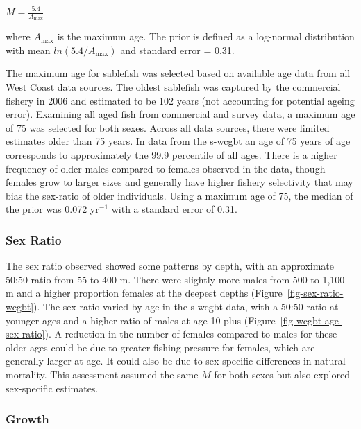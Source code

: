 \documentclass[
  english,
]{article}
\begin{document}
\begin{centering}

$M=\frac{5.4}{A_{\text{max}}}$

\end{centering}

\vspace{0.5cm}

where \(A_{\text{max}}\) is the maximum age. The prior is defined as a
log-normal distribution with mean \(ln(5.4/A_{\text{max}})\) and
standard error = 0.31.

The maximum age for sablefish was selected based on available age data
from all West Coast data sources. The oldest sablefish was captured by
the commercial fishery in 2006 and estimated to be 102 years (not
accounting for potential ageing error). Examining all aged fish from
commercial and survey data, a maximum age of 75 was selected for both
sexes. Across all data sources, there were limited estimates older than
75 years. In data from the \gls{s-wcgbt} an age of 75 years of age
corresponds to approximately the 99.9 percentile of all ages. There is a
higher frequency of older males compared to females observed in the
data, though females grow to larger sizes and generally have higher
fishery selectivity that may bias the sex-ratio of older individuals.
Using a maximum age of 75, the median of the prior was 0.072 yr\(^{-1}\)
with a standard error of 0.31.

\subsubsection{Sex Ratio}\label{sex-ratio}

The sex ratio observed showed some patterns by depth, with an
approximate 50:50 ratio from 55 to 400 m. There were slightly more males
from 500 to 1,100 m and a higher proportion females at the deepest
depths (Figure~\ref{fig-sex-ratio-wcgbt}). The sex ratio varied by age
in the \gls{s-wcgbt} data, with a 50:50 ratio at younger ages and a
higher ratio of males at age 10 plus
(Figure~\ref{fig-wcgbt-age-sex-ratio}). A reduction in the number of
females compared to males for these older ages could be due to greater
fishing pressure for females, which are generally larger-at-age. It
could also be due to sex-specific differences in natural mortality. This
assessment assumed the same \(M\) for both sexes but also explored
sex-specific estimates.

\subsubsection{Growth}\label{growth}
\end{document}
